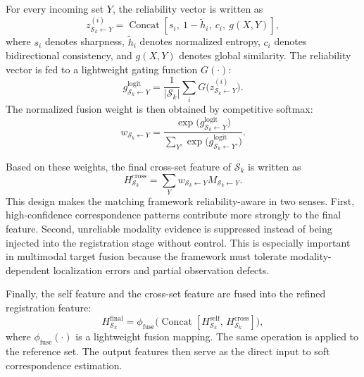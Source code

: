 For every incoming set \(Y\), the reliability vector is written as
\begin{equation}
  z_{\mathcal{S}_k \leftarrow Y}^{(i)}
  =
  \operatorname{Concat}[s_i,\ 1-\tilde{h}_i,\ c_i,\ g(X,Y)],
\end{equation}
where \(s_i\) denotes sharpness, \(\tilde{h}_i\) denotes normalized entropy, \(c_i\) denotes bidirectional consistency, and \(g(X,Y)\) denotes global similarity. The reliability vector is fed to a lightweight gating function \(G(\cdot)\):
\begin{equation}
  g_{\mathcal{S}_k \leftarrow Y}^{\mathrm{logit}} = \frac{1}{|\mathcal{S}_k|}\sum_i G\big(z_{\mathcal{S}_k \leftarrow Y}^{(i)}\big).
\end{equation}
The normalized fusion weight is then obtained by competitive softmax:
\begin{equation}
  w_{\mathcal{S}_k \leftarrow Y}
  =
  \frac{
    \exp\big(g_{\mathcal{S}_k \leftarrow Y}^{\mathrm{logit}}\big)
  }{
    \sum_{Y'} \exp\big(g_{\mathcal{S}_k \leftarrow Y'}^{\mathrm{logit}}\big)
  }.
\end{equation}

Based on these weights, the final cross-set feature of \(\mathcal{S}_k\) is written as
\begin{equation}
  H^{\mathrm{cross}}_{\mathcal{S}_k}
  =
  \sum_Y
  w_{\mathcal{S}_k \leftarrow Y} M_{\mathcal{S}_k \leftarrow Y}.
\end{equation}
This design makes the matching framework reliability-aware in two senses. First, high-confidence correspondence patterns contribute more strongly to the final feature. Second, unreliable modality evidence is suppressed instead of being injected into the registration stage without control. This is especially important in multimodal target fusion because the framework must tolerate modality-dependent localization errors and partial observation defects.

Finally, the self feature and the cross-set feature are fused into the refined registration feature:
\begin{equation}
  H^{\mathrm{final}}_{\mathcal{S}_k}
  =
  \phi_{\mathrm{fuse}}
  \big(
    \operatorname{Concat}[H^{\mathrm{self}}_{\mathcal{S}_k},\, H^{\mathrm{cross}}_{\mathcal{S}_k}]
  \big),
\end{equation}
where \(\phi_{\mathrm{fuse}}(\cdot)\) is a lightweight fusion mapping. The same operation is applied to the reference set. The output features then serve as the direct input to soft correspondence estimation.

